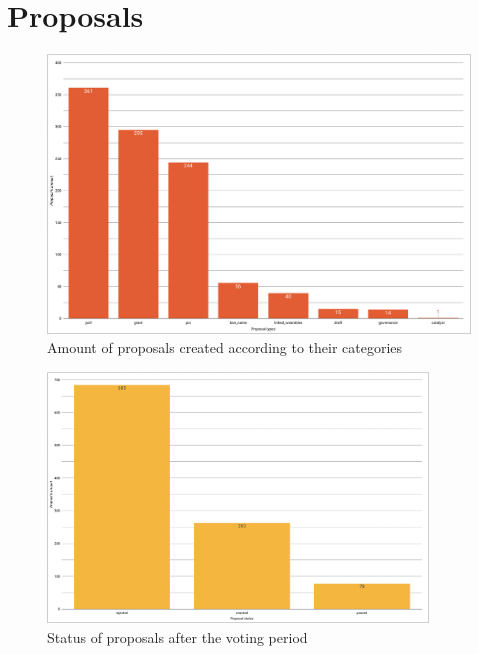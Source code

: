 \documentclass[MSE,Master,english]{twbook}%
\begin{document}
\section{Proposals}
\begin{figure}[H]
  \centering
  \includegraphics[width=\textwidth]{metrics/proposal_types.png}
  \caption{Amount of proposals created according to their categories}
  \label{fig:proposal_types}
\end{figure}

\begin{figure}[H]
  \centering
  \includegraphics[width=0.90\textwidth]{metrics/proposal_status.png}
  \caption{Status of proposals after the voting period}
  \label{fig:proposal_status}
\end{figure}
\end{document}
